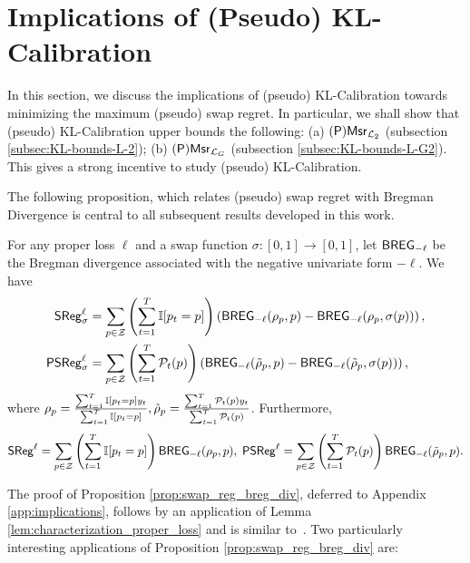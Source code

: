 \section{Implications of (Pseudo) KL-Calibration}\label{sec:implications}
 In this section, we discuss the implications of (pseudo) KL-Calibration towards minimizing the  maximum (pseudo) swap regret. In particular, we shall show that (pseudo) KL-Calibration upper bounds the following:  (a) $(\mathsf{P})\mathsf{Msr}_{\mathcal{L}_{2}}$  (subsection \ref{subsec:KL-bounds-L-2});  (b) $(\mathsf{P})\mathsf{Msr}_{\mathcal{L}_{G}}$ (subsection \ref{subsec:KL-bounds-L-G2}). This gives a strong incentive to study (pseudo) KL-Calibration.
 
The following proposition, which relates (pseudo) swap regret with Bregman Divergence is central to all subsequent results developed in this work.
\begin{proposition}\label{prop:swap_reg_breg_div}
    For any proper loss $\ell$ and a swap function $\sigma: [0, 1] \to [0, 1]$, let $\mathsf{BREG}_{-\ell}$ be the Bregman divergence associated with the negative univariate form $-\ell$. We have
    \begin{align*}
        \mathsf{SReg}_{\sigma} ^ {\ell} &= \sum_{p \in \mathcal{Z}} \left( \sum_{t = 1} ^ {T} \mathbb{I}{\left[p_{t} = p\right]} \right) \left( \mathsf{BREG}_{-\ell}(\rho_{p}, p) - \mathsf{BREG}_{-\ell}(\rho_{p}, \sigma(p)) \right), \\
        \mathsf{PSReg}_{\sigma} ^ {\ell} &= \sum_{p \in \mathcal{Z}} \left( \sum_{t = 1} ^ {T} \mathcal{P}_{t}(p) \right) \left( \mathsf{BREG}_{-\ell}(\tilde{\rho}_{p}, p) - \mathsf{BREG}_{-\ell}(\tilde{\rho}_{p}, \sigma(p)) \right),
    \end{align*}
where $\rho_{p} = \frac{\sum_{t = 1} ^ {T} \mathbb{I}{\left[p_{t} = p\right]} y_{t}}{\sum_{t = 1} ^ {T} \mathbb{I}{\left[p_{t} = p\right]}}, \tilde{\rho}_{p} = \frac{\sum_{t = 1} ^ {T} \mathcal{P}_{t}(p) y_{t}}{\sum_{t = 1} ^ {T} \mathcal{P}_{t}(p)}$. Furthermore, \begin{align*}
   \mathsf{SReg} ^ {\ell} = \sum_{p \in \mathcal{Z}} \left( \sum_{t = 1} ^ {T} \mathbb{I}{\left[p_{t} = p\right]} \right) {\mathsf{BREG}_{-\ell}(\rho_{p}, p)}, \;
   \mathsf{PSReg} ^ {\ell} = \sum_{p \in \mathcal{Z}} \left( \sum_{t = 1} ^ {T} \mathcal{P}_{t}(p) \right) {\mathsf{BREG}_{-\ell}(\tilde{\rho}_{p}, p)}.
\end{align*}
\end{proposition}
The proof of Proposition \ref{prop:swap_reg_breg_div}, deferred to Appendix \ref{app:implications}, follows by an application of Lemma \ref{lem:characterization_proper_loss} and is similar to~\citet{hu2024predict}. Two particularly interesting applications of Proposition \ref{prop:swap_reg_breg_div} are:
